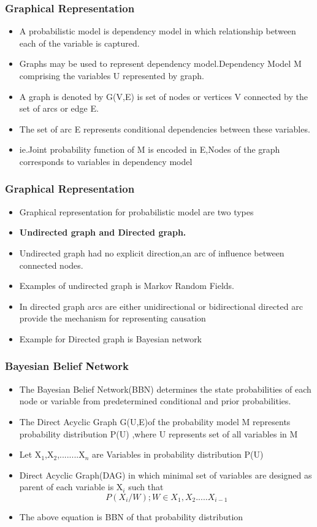 \documentclass{beamer}
\begin{document}
\begin{frame}
\frametitle{\textbf{Graphical Representation}}
\begin{itemize}
\item A probabilistic model is dependency model in which  relationship between each of the variable is captured.
\item Graphs may be used to represent dependency model.Dependency Model M comprising the variables U represented by graph.
\item A graph is denoted by G(V,E) is set of nodes or vertices V connected by the set of arcs or edge E.
\item The set of arc E represents conditional dependencies between these variables.
\item ie.Joint probability function of M is encoded in E,Nodes of the graph corresponds to variables in dependency model
\end{itemize}
\end{frame}
\begin{frame}
\frametitle{\textbf{Graphical Representation}}
\begin{itemize}
\item Graphical representation for probabilistic model are two types
\item \textbf{ Undirected graph and Directed graph.}
\item Undirected graph had no explicit direction,an arc of influence between connected nodes.
\item Examples of undirected graph is Markov Random Fields.
\item In directed graph arcs are either unidirectional or bidirectional directed arc provide the mechanism for representing causation
\item Example for Directed graph is Bayesian network
\end{itemize}
\end{frame}
\begin{frame}
\frametitle{\textbf{Bayesian Belief Network}}
\begin{itemize}
\item The Bayesian Belief Network(BBN) determines the state probabilities of each node or variable from predetermined conditional and prior probabilities.
\item The Direct Acyclic Graph G(U,E)of the probability model M represents probability distribution P(U) ,where U represents set of all variables in M
\item Let X${_1}$,X${_2}$,........X${_n}$ are Variables in probability distribution P(U)
\item Direct Acyclic Graph(DAG) in which minimal set of variables are designed as parent of each variable is X${_i}$ such that
\begin{equation}\label{}
   P(X{_i}/W);   W\in{X{_1},X{_2}.....X{_{i-1}}}
\end{equation}
\item The above equation is BBN of that probability distribution
\end{itemize}
\end{frame}
\end{document}
